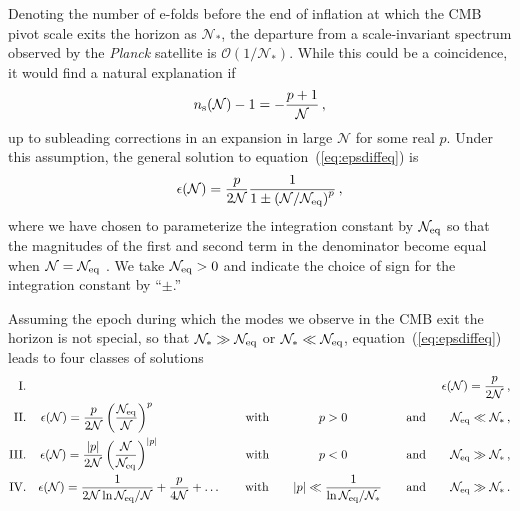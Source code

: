 Denoting the number of e-folds before the end of inflation at which the CMB pivot scale exits the horizon as $\mathcal{N}_\ast$, the departure from a scale-invariant spectrum observed by the {\it Planck\/} satellite is $\mathcal{O}(1/\mathcal{N}_\ast)$. While this could be a coincidence, it would find a natural explanation if 
\begin{equation}\label{eq:nsassump}
n_{\rm s}(\mathcal{N})-1=-\frac{p+1}{\mathcal{N}}\,,
\end{equation}
up to subleading corrections in an expansion in large $\mathcal{N}$ for some real $p$. Under this assumption, the general solution to equation~(\ref{eq:epsdiffeq}) is
\begin{equation}\label{eq:epssol}
\epsilon(\mathcal{N})=\frac{p}{2\mathcal{N}}\frac{1}{1\pm\left(\mathcal{N}/\mathcal{N}_{\rm eq}\right)^{p}}\,,
\end{equation}
where we have chosen to parameterize the integration constant by $\mathcal{N}_{\rm eq}$ so that the magnitudes of the first and second term in the denominator become equal when $\mathcal{N}=\mathcal{N}_{\rm eq}$ . We take $\mathcal{N}_{\rm eq}>0$ and indicate the choice of sign for the integration constant by ``$\pm$.''

Assuming the epoch during which the modes we observe in the CMB exit the horizon is not special, so that $\mathcal{N}_\ast\gg\mathcal{N}_{\rm eq}$ or $\mathcal{N}_\ast\ll\mathcal{N}_{\rm eq}$, equation~(\ref{eq:epsdiffeq}) leads to four classes of solutions
\begin{eqnarray}
{\rm I.}&&\epsilon(\mathcal{N})=\frac{p}{2\mathcal{N}}\,,\label{eq:classI}\\
{\rm II.}&&\epsilon(\mathcal{N})=\frac{p}{2\mathcal{N}}\left(\frac{\mathcal{N}_{\rm eq}}{\mathcal{N}}\right)^p\hspace{1.92cm}\qquad{\rm with}\qquad \hspace{7.3mm}p>0 \hspace{1.0cm}\qquad{\rm and}\qquad\mathcal{N}_{\rm eq}\ll\mathcal{N}_\ast\,,\label{eq:classII}\\
{\rm III.}&&\epsilon(\mathcal{N})=\frac{|p|}{2\mathcal{N}}\left(\frac{\mathcal{N}}{\mathcal{N}_{\rm eq}}\right)^{|p|}\hspace{1.77cm}\qquad{\rm with}\qquad \hspace{7.3mm}p<0 \hspace{1.0cm}\qquad{\rm and}\qquad\mathcal{N}_{\rm eq}\gg\mathcal{N}_\ast\,,\label{eq:classIII}\\
{\rm IV.}&&\epsilon(\mathcal{N})=\frac{1}{2\mathcal{N}\ln\mathcal{N}_{\rm eq}/\mathcal{N}}+\frac{p}{4\mathcal{N}}+\dots\qquad{\rm with}\qquad |p|\ll\frac{1}{\ln\mathcal{N}_{\rm eq}/\mathcal{N}_\ast}\qquad{\rm and}\qquad \mathcal{N}_{\rm eq}\gg\mathcal{N}_\ast\,.\label{eq:classIV}
\end{eqnarray}

